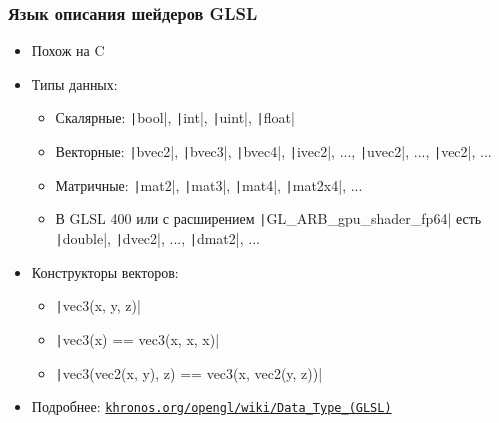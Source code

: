 \documentclass[10pt]{beamer}
\begin{document}
\begin{frame}[fragile]
\frametitle{Язык описания шейдеров GLSL}
\begin{itemize}
\item Похож на C
\pause
\item Типы данных:
\pause
\begin{itemize}
\item Скалярные: \texttt|bool|, \texttt|int|, \texttt|uint|, \texttt|float|
\pause
\item Векторные: \texttt|bvec2|, \texttt|bvec3|, \texttt|bvec4|, \texttt|ivec2|, ..., \texttt|uvec2|, ..., \texttt|vec2|, ...
\pause
\item Матричные: \texttt|mat2|, \texttt|mat3|, \texttt|mat4|, \texttt|mat2x4|, ...
\pause
\item В GLSL 400 или с расширением \texttt|GL_ARB_gpu_shader_fp64| есть \texttt|double|, \texttt|dvec2|, ..., \texttt|dmat2|, ...
\end{itemize}
\pause
\item Конструкторы векторов:
\pause
\begin{itemize}
\item \texttt|vec3(x, y, z)|
\pause
\item \texttt|vec3(x) == vec3(x, x, x)|
\pause
\item \texttt|vec3(vec2(x, y), z) == vec3(x, vec2(y, z))|
\end{itemize}
\pause
\item Подробнее: \href{https://www.khronos.org/opengl/wiki/Data_Type_(GLSL)}{\nolinkurl{khronos.org/opengl/wiki/Data\_Type\_(GLSL)}}
\end{itemize}
\end{frame}
\end{document}
